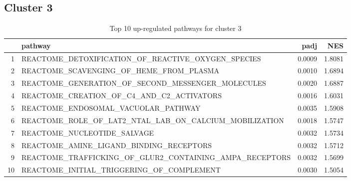 \documentclass{article}
\begin{document}
\subsection{Cluster 3 }
\begin{table}[H]
\centering
\begin{tabularx}{\textwidth}{rlrr}
  \hline
 & pathway & padj & NES \\ 
  \hline
1 & REACTOME\_DETOXIFICATION\_OF\_REACTIVE\_OXYGEN\_SPECIES & 0.0009 & 1.8081 \\ 
  2 & REACTOME\_SCAVENGING\_OF\_HEME\_FROM\_PLASMA & 0.0010 & 1.6894 \\ 
  3 & REACTOME\_GENERATION\_OF\_SECOND\_MESSENGER\_MOLECULES & 0.0020 & 1.6887 \\ 
  4 & REACTOME\_CREATION\_OF\_C4\_AND\_C2\_ACTIVATORS & 0.0016 & 1.6031 \\ 
  5 & REACTOME\_ENDOSOMAL\_VACUOLAR\_PATHWAY & 0.0035 & 1.5908 \\ 
  6 & REACTOME\_ROLE\_OF\_LAT2\_NTAL\_LAB\_ON\_CALCIUM\_MOBILIZATION & 0.0018 & 1.5747 \\ 
  7 & REACTOME\_NUCLEOTIDE\_SALVAGE & 0.0032 & 1.5734 \\ 
  8 & REACTOME\_AMINE\_LIGAND\_BINDING\_RECEPTORS & 0.0032 & 1.5712 \\ 
  9 & REACTOME\_TRAFFICKING\_OF\_GLUR2\_CONTAINING\_AMPA\_RECEPTORS & 0.0032 & 1.5699 \\ 
  10 & REACTOME\_INITIAL\_TRIGGERING\_OF\_COMPLEMENT & 0.0030 & 1.5054 \\ 
   \hline
\end{tabularx}
\caption{Top 10 up-regulated pathways for cluster 3} 
\label{tab:q3_2_3}
\end{table}
\end{document}
